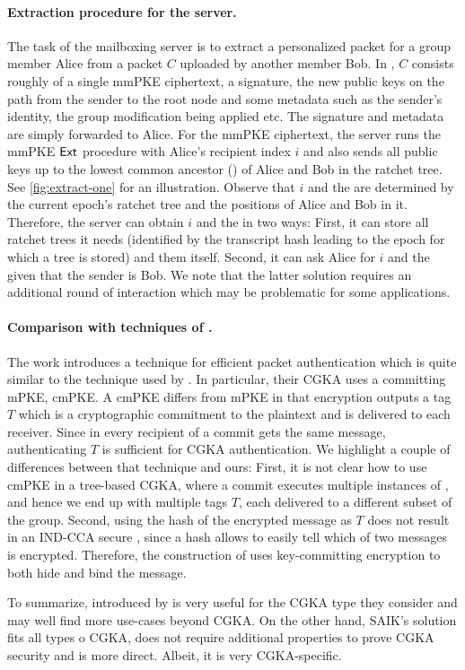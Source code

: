 \paragraph{Extraction procedure for the server.}
The task of the mailboxing server is to extract a personalized packet for a group member Alice from a packet $C$
uploaded by another member Bob. In \saik, $C$ consists roughly of a single mmPKE ciphertext, a signature, the new public
keys on the path from the sender to the root node and some metadata such as the sender's identity, the group
modification being applied etc. The signature and metadata are simply forwarded to Alice. For the mmPKE ciphertext, the
server runs the mmPKE ${\mathsf{Ext}}$ procedure with Alice's recipient index $i$ and also sends all public keys up to the
lowest common ancestor (\lca) of Alice and Bob in the ratchet tree. See \cref{fig:extract-one} for an illustration.
Observe that $i$ and the \lca are determined by the current epoch's ratchet tree and the positions of Alice and Bob in
it. Therefore, the server can obtain $i$ and the \lca in two ways: First, it can store all ratchet trees it needs
(identified by the transcript hash leading to the epoch for which a tree is stored) and them itself. Second, it can ask
Alice for $i$ and the \lca given that the sender is Bob. We note that the latter solution requires an additional round of interaction which may be problematic for some applications.



\paragraph{Comparison with techniques of \cite{hashimoto2021cmpke}.}
The work \cite{hashimoto2021cmpke} introduces a technique for efficient packet authentication which is quite similar to the technique used by \saik. In particular, their CGKA uses a committing mPKE, cmPKE. A cmPKE differs from mPKE in that encryption outputs a tag $T$ which is a cryptographic commitment to the plaintext and is delivered to each receiver. Since in \cite{hashimoto2021cmpke} every recipient of a commit gets the same message, authenticating $T$ is sufficient for CGKA authentication.
%
We highlight a couple of differences between that technique and ours:
First, it is not clear how to use cmPKE in a tree-based CGKA, where a commit executes multiple instances of \protCMPKE, and hence we end up with multiple tags $T$, each delivered to a different subset of the group.
%
Second, using the hash of the encrypted message as $T$ does not result in an IND-CCA secure \protCMPKE, since a hash allows to easily tell which of two messages is encrypted. Therefore, the construction of \cite{hashimoto2021cmpke} uses key-committing encryption to both hide and bind the message.

To summarize, \protCMPKE introduced by \cite{hashimoto2021cmpke} is very useful for the CGKA type they consider and may well find more use-cases beyond CGKA. On the other hand, \textsf{SAIK}’s solution fits all types o CGKA, does not require additional properties to prove CGKA security and is more direct. Albeit, it is very CGKA-specific.
